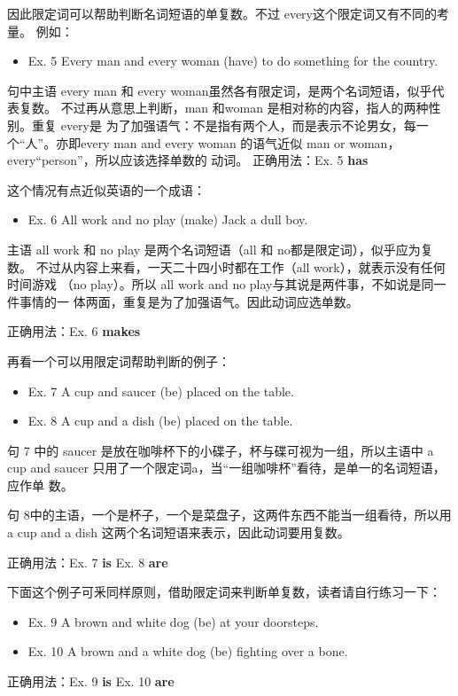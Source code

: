 \documentclass{yufa}
\begin{document}
因此限定词可以帮助判断名词短语的单复数。不过 every这个限定词又有不同的考量。
例如：
\begin{mybox}
  \begin{itemize}
  \item Ex. 5 Every man and every woman (have) to do something for the country.
  \end{itemize}
  句中主语 every man 和 every woman虽然各有限定词，是两个名词短语，似乎代表复数。
  不过再从意思上判断，man 和woman 是相对称的内容，指人的两种性别。重复 every是
  为了加强语气：不是指有两个人，而是表示不论男女，每一个“人”。亦即every man
  and every woman 的语气近似 man or woman，every“person”，所以应该选择单数的
  动词。
  \tcblower
  正确用法：Ex. 5 \textbf{has}
\end{mybox}

这个情况有点近似英语的一个成语：
\begin{mybox}
  \begin{itemize}
  \item   Ex. 6 All work and no play (make) Jack a dull boy.
  \end{itemize}
  主语 all work 和 no play 是两个名词短语（all 和 no都是限定词），似乎应为复数。
  不过从内容上来看，一天二十四小时都在工作（all work），就表示没有任何时间游戏
  （no play）。所以 all work and no play与其说是两件事，不如说是同一件事情的一
  体两面，重复是为了加强语气。因此动词应选单数。

  \tcblower
  正确用法：Ex. 6 \textbf{makes}
\end{mybox}

再看一个可以用限定词帮助判断的例子：
\begin{mybox}
  \begin{itemize}
  \item   Ex. 7 A cup and saucer (be) placed on the table.
  \item   Ex. 8 A cup and a dish (be) placed on the table.
  \end{itemize}
  句 7 中的 saucer 是放在咖啡杯下的小碟子，杯与碟可视为一组，所以主语中 a cup
  and saucer 只用了一个限定词a，当“一组咖啡杯”看待，是单一的名词短语，应作单
  数。

  句 8中的主语，一个是杯子，一个是菜盘子，这两件东西不能当一组看待，所以用 a
  cup and a dish 这两个名词短语来表示，因此动词要用复数。

  \tcblower
  正确用法：Ex. 7 \textbf{is} \qquad\quad Ex. 8 \textbf{are}
\end{mybox}

下面这个例子可釆同样原则，借助限定词来判断单复数，读者请自行练习一下：
\begin{mybox}
  \begin{itemize}
  \item   Ex. 9 A brown and white dog (be) at your doorsteps.
  \item   Ex. 10 A brown and a white dog (be) fighting over a bone.
  \end{itemize}
  \tcblower
  正确用法：Ex. 9 \textbf{is} \qquad\quad Ex. 10 \textbf{are}
\end{mybox}
\end{document}
